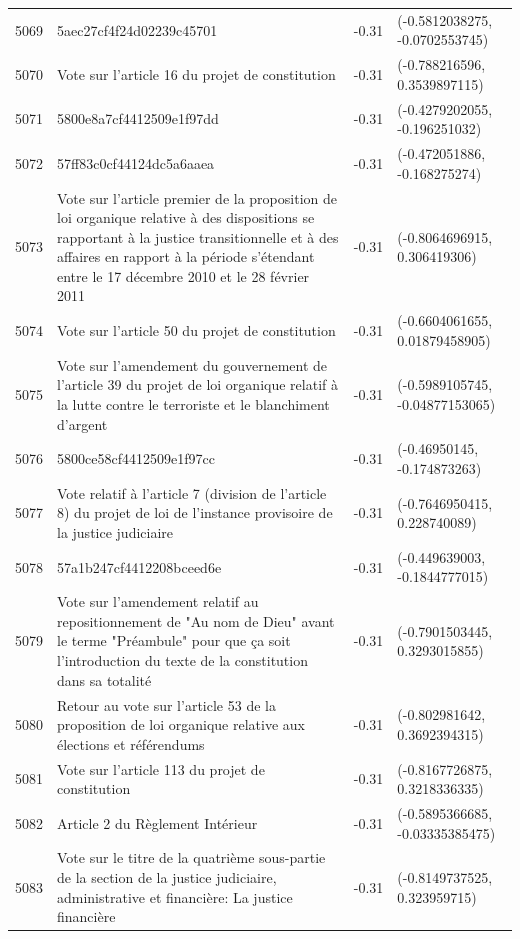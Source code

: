 \begin{table}[ht]
\begin{tabular}{rlrl}
  5069 & 5aec27cf4f24d02239c45701 & -0.31 & (-0.5812038275, -0.0702553745) \\ 
  5070 & Vote sur l'article 16 du projet de constitution & -0.31 & (-0.788216596, 0.3539897115) \\ 
  5071 & 5800e8a7cf4412509e1f97dd & -0.31 & (-0.4279202055, -0.196251032) \\ 
  5072 & 57ff83c0cf44124dc5a6aaea & -0.31 & (-0.472051886, -0.168275274) \\ 
  5073 & Vote sur l'article premier de la proposition de loi organique relative à des dispositions se rapportant à la justice transitionnelle et à des affaires en rapport à la période s'étendant entre le 17 décembre 2010 et le 28 février 2011 & -0.31 & (-0.8064696915, 0.306419306) \\ 
  5074 & Vote sur l'article 50 du projet de constitution & -0.31 & (-0.6604061655, 0.01879458905) \\ 
  5075 & Vote sur l'amendement du gouvernement de l'article 39 du projet de loi organique relatif à la lutte contre le terroriste et le blanchiment d'argent & -0.31 & (-0.5989105745, -0.04877153065) \\ 
  5076 & 5800ce58cf4412509e1f97cc & -0.31 & (-0.46950145, -0.174873263) \\ 
  5077 & Vote relatif à l'article 7 (division de l'article 8) du projet de loi de l'instance provisoire de la justice judiciaire & -0.31 & (-0.7646950415, 0.228740089) \\ 
  5078 & 57a1b247cf4412208bceed6e & -0.31 & (-0.449639003, -0.1844777015) \\ 
  5079 & Vote sur l'amendement relatif au repositionnement de "Au nom de Dieu" avant le terme "Préambule" pour que ça soit l'introduction du texte de la constitution dans sa totalité & -0.31 & (-0.7901503445, 0.3293015855) \\ 
  5080 & Retour au vote sur l'article 53 de la proposition de loi organique relative aux élections et référendums & -0.31 & (-0.802981642, 0.3692394315) \\ 
  5081 & Vote sur l'article 113 du projet de constitution & -0.31 & (-0.8167726875, 0.3218336335) \\ 
  5082 & Article 2 du Règlement Intérieur & -0.31 & (-0.5895366685, -0.03335385475) \\ 
  5083 & Vote sur le titre de la quatrième sous-partie de la section de la justice judiciaire, administrative et financière: La justice financière & -0.31 & (-0.8149737525, 0.323959715) \\ 

\end{tabular}
\end{table}

